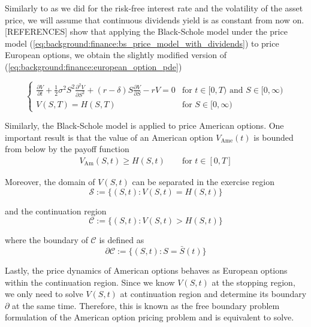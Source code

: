 Similarly to
as we did for the risk-free interest rate and the volatility of the asset price,
we will assume that continuous dividends yield is as constant from now on. [REFERENCES]
show that applying the Black-Schole model under the price model (\ref*{eq:background:finance:bs_price_model_with_dividends}) to price European options,
we obtain the slightly modified version of (\ref*{eq:background:finance:european_option_pde})

\begin{equation}
  \begin{cases}
    \frac{\partial{V}}{\partial{t}} + \frac{1}{2}\sigma^{2} S^2 \frac{\partial^2{V}}{\partial{S^2}} + (r - \delta) S \frac{\partial{V}}{\partial{S}} - rV = 0 & \text{for $t\in[0,T)$ and $S\in[0, \infty)$} \\
    V(S, T) = H(S, T) & \text{for $S\in[0, \infty)$}
  \end{cases}
  \label{eq:chapter2:european_option_pde_with_dividens}
\end{equation}
 
Similarly, the Black-Schole model is applied to price American options. 
One important result is that the value of an American option $V_\text{Ame}(t)$ is
bounded from below by the payoff function
\begin{align}
  V_{\text{Am}}(S, t) \ge H(S, t) \qquad \text{for $t\in[0,T]$}
  \label{eq:background:american_options_price_lower_bound}
\end{align}

Moreover, the domain of $V(S,t)$ can be separated in the exercise region 
\begin{equation}
  \mathcal{S} := \{(S, t): V(S, t) = H(S, t) \}
\end{equation}

and the continuation region 
\begin{equation}
  \mathcal{C} := \{(S, t): V(S, t) > H(S, t) \}
\end{equation}

where the boundary of $\mathcal{C}$ is defined as
\begin{equation}
  \partial \mathcal{C} := \{(S, t): S = \bar{S}(t)\} 
\end{equation}

Lastly, the price dynamics of American options behaves as European options within
the continuation region. Since we know $V(S, t)$ at the stopping region, we only
need to solve $V(S,t)$ at continuation region and determine its boundary $\partial$
at the same time. Therefore, this is known as the free boundary problem formulation
of the American option pricing problem and is equivalent to solve.

